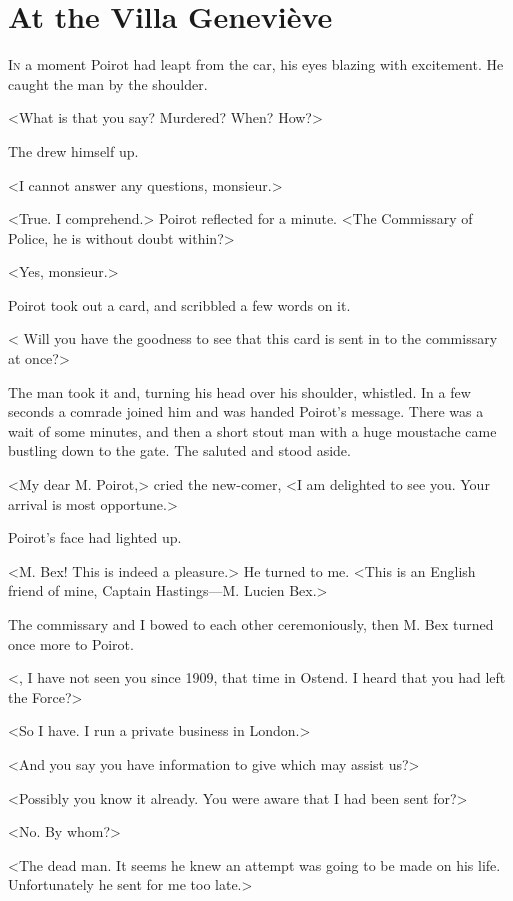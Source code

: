\chapter{At the Villa Geneviève}

\lettrine{I}{n} a moment Poirot had leapt from the car, his eyes blazing with excitement. He caught the man by the shoulder. 

\zz
 <What is that you say? Murdered? When? How?> 

\zz
 The  drew himself up. 

 <I cannot answer any questions, monsieur.> 

 <True. I comprehend.> Poirot reflected for a minute. <The Commissary of Police, he is without doubt within?> 

 <Yes, monsieur.> 

 Poirot took out a card, and scribbled a few words on it. 

 < Will you have the goodness to see that this card is sent in to the commissary at once?> 

 The man took it and, turning his head over his shoulder, whistled. In a few seconds a comrade joined him and was handed Poirot's message. There was a wait of some minutes, and then a short stout man with a huge moustache came bustling down to the gate. The  saluted and stood aside. 

 <My dear M. Poirot,> cried the new-comer, <I am delighted to see you. Your arrival is most opportune.> 

 Poirot's face had lighted up. 

 <M. Bex! This is indeed a pleasure.> He turned to me. <This is an English friend of mine, Captain Hastings—M. Lucien Bex.> 

 The commissary and I bowed to each other ceremoniously, then M. Bex turned once more to Poirot. 

 <, I have not seen you since 1909, that time in Ostend. I heard that you had left the Force?> 

 <So I have. I run a private business in London.> 

 <And you say you have information to give which may assist us?> 

 <Possibly you know it already. You were aware that I had been sent for?> 

 <No. By whom?> 

 <The dead man. It seems he knew an attempt was going to be made on his life. Unfortunately he sent for me too late.> 

